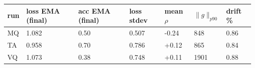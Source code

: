 \begin{tabular}{lllllll}
\toprule
run & loss EMA (final) & acc EMA (final) & loss stdev & mean $\rho$ & $\|g\|_{p90}$ & drift \% \\
\midrule
MQ & 1.082 & 0.50 & 0.507 & -0.24 & 848 & 0.86 \\
TA & 0.958 & 0.70 & 0.786 & +0.12 & 865 & 0.84 \\
VQ & 1.073 & 0.38 & 0.748 & +0.11 & 1901 & 0.88 \\
\bottomrule
\end{tabular}

